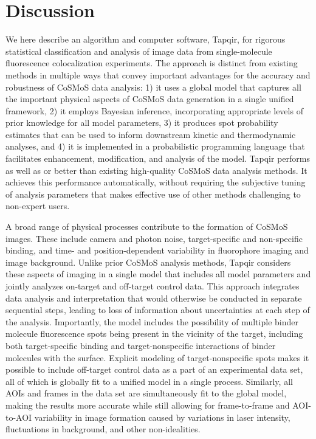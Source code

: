 \section*{Discussion}

We here describe an algorithm and computer software, Tapqir, for rigorous statistical classification and analysis of image data from single-molecule fluorescence colocalization experiments. The approach is distinct from existing methods in multiple ways that convey important advantages for the accuracy and robustness of CoSMoS data analysis: 1) it uses a global model that captures all the important physical aspects of CoSMoS data generation in a single unified framework, 2) it employs Bayesian inference, incorporating appropriate levels of prior knowledge for all model parameters, 3) it produces spot probability estimates that can be used to inform downstream kinetic and thermodynamic analyses, and 4) it is implemented in a probabilistic programming language that facilitates enhancement, modification, and analysis of the model. Tapqir performs as well as or better than  existing high-quality CoSMoS data analysis methods. It achieves this performance automatically, without requiring the subjective tuning of analysis parameters that makes effective use of other methods challenging to non-expert users.

A broad range of physical processes contribute to the formation of CoSMoS images. These include camera and photon noise, target-specific and non-specific binding, and time- and position-dependent variability in fluorophore imaging and image background. Unlike prior CoSMoS analysis methods, Tapqir considers these aspects of imaging in a single model that includes all model parameters and jointly analyzes on-target and off-target control data.  This approach integrates data analysis and interpretation that would otherwise be conducted in separate sequential steps, leading to loss of information about uncertainties at each step of the analysis. Importantly, the model includes the possibility of multiple binder molecule fluorescence spots being present in the vicinity of the target, including both target-specific binding and target-nonspecific interactions of binder molecules with the surface. Explicit modeling of target-nonspecific spots makes it possible to include off-target control data as a part of an experimental data set, all of which is globally fit to a unified model in a single process.  Similarly, all AOIs and frames in the data set are simultaneously fit to the global model, making the results more accurate while still allowing for frame-to-frame and AOI-to-AOI variability in image formation caused by variations in laser intensity, fluctuations in background, and other non-idealities.

